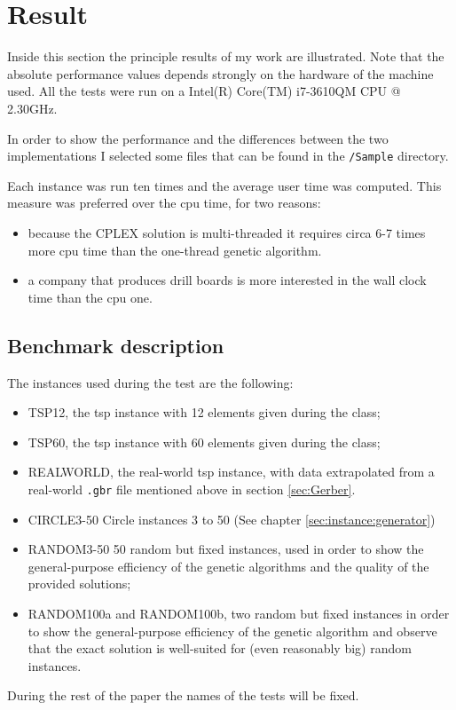 \section{Result}
\label{sec:result}
Inside this section the principle results of my work are illustrated. Note that
the absolute performance values depends strongly on the hardware of the machine used.
All the tests were run on a Intel(R) Core(TM) i7-3610QM CPU @ 2.30GHz.

In order to show the performance and the differences between the two implementations I selected some files
that can be found in the \verb|/Sample| directory.

Each instance was run ten times and the average
user time was computed.
This measure was preferred over the cpu time,
for two reasons:
\begin{itemize}
	\item because the CPLEX solution is multi-threaded it requires
	circa 6-7 times more cpu time than the one-thread genetic algorithm.
	\item a company that produces drill boards is more interested in the wall clock time than the cpu one.
\end{itemize} 

\subsection{Benchmark description}
The instances used during the test are the following:
\begin{itemize}
	\item TSP12, the tsp instance with 12 elements given during the class;
	\item TSP60, the tsp instance with 60 elements given during the class;
	\item REALWORLD, the real-world tsp instance, with data extrapolated from a real-world
	\verb|.gbr| file mentioned above in section \ref{sec:Gerber}.
	\item CIRCLE3-50 Circle instances 3 to 50 (See chapter \ref{sec:instance:generator})
	\item RANDOM3-50 50 random but fixed instances, used in order to show the general-purpose efficiency of the genetic algorithms and the quality of the provided solutions;
	\item RANDOM100a and RANDOM100b, two random but fixed instances
	in order to show the general-purpose efficiency of the genetic algorithm and observe that the exact solution is well-suited
	for (even reasonably big) random instances.
\end{itemize}
During the rest of the paper the names of the tests will be fixed.
\newpage
